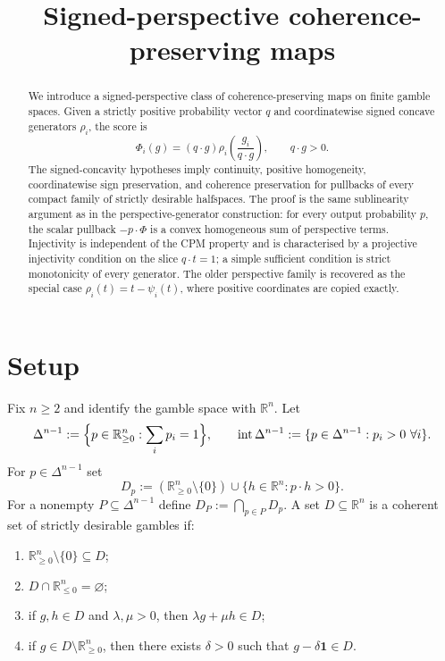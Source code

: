 \documentclass[11pt]{article}
\title{Signed-perspective coherence-preserving maps}
\author{}
\date{}
\theoremstyle{plain}
\theoremstyle{definition}
\theoremstyle{remark}
\DeclareMathOperator{\interior}{int}
\newcommand{\R}{\mathbb{R}}
\newcommand{\one}{\mathbf 1}
\newcommand{\DeltaN}{\Delta^{n-1}}
\begin{document}
\maketitle

\begin{abstract}
We introduce a signed-perspective class of coherence-preserving maps on finite gamble spaces.  Given a strictly positive probability vector $q$ and coordinatewise signed concave generators $\rho_i$, the score is
\[
\Phi_i(g)=(q\cdot g)\rho_i\!\left(\frac{g_i}{q\cdot g}\right),
\qquad q\cdot g>0.
\]
The signed-concavity hypotheses imply continuity, positive homogeneity, coordinatewise sign preservation, and coherence preservation for pullbacks of every compact family of strictly desirable halfspaces.  The proof is the same sublinearity argument as in the perspective-generator construction: for every output probability $p$, the scalar pullback $-p\cdot\Phi$ is a convex homogeneous sum of perspective terms.  Injectivity is independent of the CPM property and is characterised by a projective injectivity condition on the slice $q\cdot t=1$; a simple sufficient condition is strict monotonicity of every generator.  The older perspective family is recovered as the special case $\rho_i(t)=t-\psi_i(t)$, where positive coordinates are copied exactly.
\end{abstract}

\section{Setup}

Fix $n\ge 2$ and identify the gamble space with $\R^n$. Let
\[
\DeltaN:=\Bigl\{p\in\R^n_{\ge 0}:\sum_i p_i=1\Bigr\},
\qquad
\interior\DeltaN:=\{p\in\DeltaN:p_i>0\ \forall i\}.
\]
For $p\in\DeltaN$ set
\[
D_p:=(\R^n_{\ge 0}\setminus\{0\})\cup\{h\in\R^n:p\cdot h>0\}.
\]
For a nonempty $P\subseteq\DeltaN$ define $D_P:=\bigcap_{p\in P}D_p$.
A set $D\subseteq\R^n$ is a coherent set of strictly desirable gambles if:
\begin{enumerate}[label=(D\arabic*)]
\item $\R^n_{\ge0}\setminus\{0\}\subseteq D$;
\item $D\cap\R^n_{\le0}=\varnothing$;
\item if $g,h\in D$ and $\lambda,\mu>0$, then $\lambda g+\mu h\in D$;
\item if $g\in D\setminus\R^n_{\ge0}$, then there exists $\delta>0$ such that $g-\delta\one\in D$.
\end{enumerate}
\end{document}
